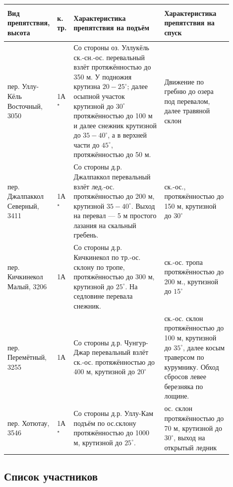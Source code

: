 \begin{table}[h!]
		\begin{tabular}{|>{\centering\arraybackslash}m{0.17\linewidth}|>{\centering\arraybackslash}m{0.03\linewidth}|>{\centering\arraybackslash}m{0.4\linewidth}|>{\centering\arraybackslash}m{0.3\linewidth}|}
			\hline
			\textbf{Вид препятствия, высота} &
			\begin{turn}{90}\textbf{к. тр.}\end{turn} &
			\textbf{Характеристика препятствия на подъём} &
			\textbf{Характеристика препятствия на спуск} \\
			\hline			
			пер. Уллу-Кёль Восточный, 3050 & 1А$^{\star}$ &  Со стороны оз. Уллукёль ск.-сн.-ос. перевальный взлёт протяжённостью до 350 м. У подножия крутизна $20-25^{\circ}$; далее осыпной участок крутизной до $30^{\circ}$ протяжённостью до 100 м и далее снежник крутизной до $35-40^{\circ}$, а в верхней части до $45^{\circ}$, протяжённостью до 50 м. & Движение по гребню до озера под перевалом, далее травяной склон \\
			\hline			
			пер. Джалпаккол Северный, 3411  & 1А$^{\star}$ & Со стороны д.р. Джалпаккол перевальный взлёт лед.-ос. протяжённостью до 200 м, крутизной $35-40^{\circ}$. Выход на перевал — 5 м простого лазания на скальный гребень.  & ск.-ос., протяжённостью до 150 м, крутизной до $30^{\circ}$ \\
			\hline
			пер. Кичкинекол Малый, 3206  & 1А & Со стороны д.р. Кичкинекол по тр.-ос. склону по тропе, протяжённостью до 300 м, крутизной до $25^{\circ}$. На седловине перевала снежник. & ск.-ос. тропа протяжённостью до 200 м., крутизной до $15^{\circ}$\\
			\hline
			пер. Перемётный, 3255  & 1А & Со стороны д.р. Чунгур-Джар перевальный взлёт ск.-ос. протяжённостью до 400 м, крутизной до  $20^{\circ}$ & ск.-ос. склон протяжённостью до 100 м, крутизной до $35^{\circ}$, далее косым траверсом по курумнику. Обход сбросов левее березняка по лощине.\\
			\hline
			пер. Хотютау, 3546  & 1А$^{\star}$ & Со стороны д.р. Уллу-Кам подъём по ос.склону протяжённостью до 1000 м, крутизной до $25^{\circ}$. &  ос. склон протяжённостью до 70 м, крутизной до $30^{\circ}$, выход на открытый ледник\\
			\hline
	\end{tabular}%
\end{table}

\clearpage
\subsection{Список участников} 


